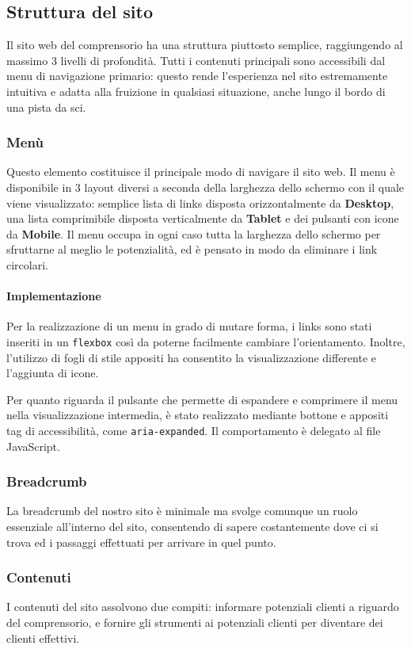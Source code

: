 \subsection{Struttura del sito}
Il sito web del comprensorio ha una struttura piuttosto semplice, raggiungendo al massimo 3 livelli di profondità.
Tutti i contenuti principali sono accessibili dal menu di navigazione primario: questo rende l'esperienza nel sito estremamente intuitiva e adatta alla fruizione in qualsiasi situazione, anche lungo il bordo di una pista da sci.

\subsubsection{Menù}
Questo elemento costituisce il principale modo di navigare il sito web. Il menu è disponibile in 3 layout diversi a seconda della larghezza dello schermo con il quale viene visualizzato: semplice lista di links disposta orizzontalmente da \textbf{Desktop}, una lista comprimibile disposta verticalmente da \textbf{Tablet} e dei pulsanti con icone da \textbf{Mobile}.
Il menu occupa in ogni caso tutta la larghezza dello schermo per sfruttarne al meglio le potenzialità, ed è pensato in modo da eliminare i link circolari.
\paragraph{Implementazione}\label{MenuPrinc}
Per la realizzazione di un menu in grado di mutare forma, i links sono stati inseriti in un \verb|flexbox| così da poterne facilmente cambiare l'orientamento. Inoltre, l'utilizzo di fogli di stile appositi ha consentito la visualizzazione differente e l'aggiunta di icone.

Per quanto riguarda il pulsante che permette di espandere e comprimere il menu nella visualizzazione intermedia, è stato realizzato mediante bottone e appositi tag di accessibilità, come \verb|aria-expanded|. Il comportamento è delegato al file JavaScript.
\subsubsection{Breadcrumb}
La breadcrumb del nostro sito è minimale ma svolge comunque un ruolo essenziale all'interno del sito, consentendo di sapere costantemente dove ci si trova ed i passaggi effettuati per arrivare in quel punto.
\subsubsection{Contenuti}
I contenuti del sito assolvono due compiti: informare potenziali clienti a riguardo del comprensorio, e fornire gli strumenti ai potenziali clienti per diventare dei clienti effettivi.

